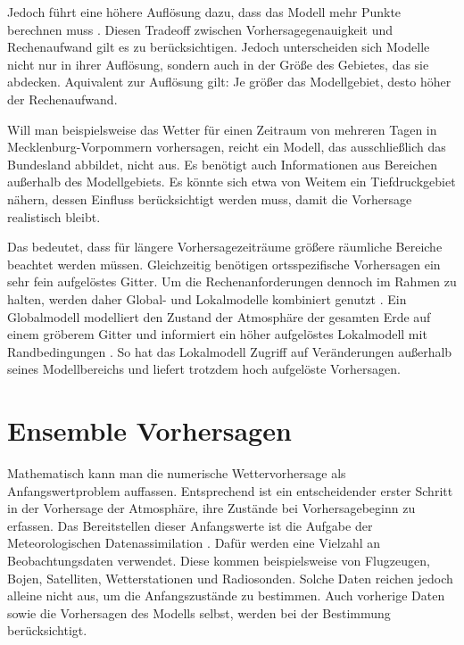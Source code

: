Jedoch führt eine höhere Auflösung dazu, dass das Modell mehr Punkte berechnen muss \parencite{DWD_wie_entsteht}. Diesen Tradeoff zwischen Vorhersagegenauigkeit und Rechenaufwand gilt es zu berücksichtigen. Jedoch unterscheiden sich Modelle  nicht nur in ihrer Auflösung, sondern auch in der Größe des Gebietes, das sie abdecken. Aquivalent zur Auflösung gilt: Je größer das Modellgebiet, desto höher der Rechenaufwand.

Will man beispielsweise das Wetter für einen Zeitraum von mehreren Tagen in Meck\-lenburg-Vor\-pommern vorhersagen, reicht ein Modell, das ausschließlich das Bundesland abbildet, nicht aus. Es benötigt auch Informationen aus Bereichen außerhalb des Modellgebiets. Es könnte sich etwa von Weitem ein Tiefdruckgebiet nähern, dessen Einfluss berücksichtigt werden muss, damit die Vorhersage realistisch bleibt.

Das bedeutet, dass für längere Vorhersagezeiträume größere räumliche Bereiche beachtet werden müssen. Gleichzeitig benötigen ortsspezifische Vorhersagen ein sehr fein aufgelöstes Gitter. Um die Rechenanforderungen dennoch im Rahmen zu halten, werden daher Global- und Lokalmodelle kombiniert genutzt \parencite{DWD_wie_entsteht}. Ein Globalmodell modelliert den Zustand der Atmosphäre der gesamten Erde auf einem gröberem Gitter und informiert ein höher aufgelöstes Lokalmodell mit Randbedingungen \parencite{reinert2025icon_dwd}. So hat das Lokalmodell Zugriff auf Veränderungen außerhalb seines Modellbereichs und liefert trotzdem hoch aufgelöste Vorhersagen. 

\section{Ensemble Vorhersagen}
Mathematisch kann man die numerische Wettervorhersage als Anfangswertproblem auffassen. Entsprechend ist ein entscheidender erster Schritt in der Vorhersage der Atmosphäre, ihre Zustände bei Vorhersagebeginn zu erfassen. Das Bereitstellen dieser Anfangswerte ist die Aufgabe der Meteorologischen Datenassimilation \parencite{wergen2002datenassimilation}. Dafür werden eine Vielzahl an Beobachtungsdaten verwendet. Diese kommen beispielsweise von Flugzeugen, Bojen, Satelliten, Wetterstationen und Radiosonden. Solche Daten reichen jedoch alleine nicht aus, um die Anfangszustände zu bestimmen. Auch vorherige Daten sowie die Vorhersagen des Modells selbst, werden bei der Bestimmung berücksichtigt. 

